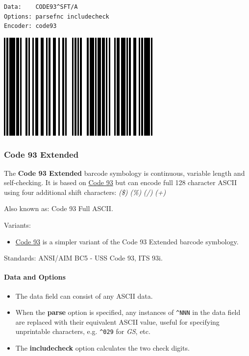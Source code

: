 \begin{verbatim}
Data:    CODE93^SFT/A
Options: parsefnc includecheck
Encoder: code93
\end{verbatim}

\includegraphics{images/code93-2.eps}

\hypertarget{code-93-extended}{%
\subsubsection{Code 93 Extended}\label{code-93-extended}}

The \textbf{Code 93 Extended} barcode symbology is continuous, variable
length and self-checking. It is based on
\protect\hyperlink{code-93}{Code 93} but can encode full 128 character
ASCII using four additional shift characters: \emph{(\$)} \emph{(\%)}
\emph{(/)} \emph{(+)}

Also known as: Code 93 Full ASCII.

Variants:

\begin{itemize}
\tightlist
\item
  \protect\hyperlink{code-93}{Code 93} is a simpler variant of the Code
  93 Extended barcode symbology.
\end{itemize}

Standards: ANSI/AIM BC5 - USS Code 93, ITS 93i.

\hypertarget{data-and-options-23}{%
\paragraph{Data and Options}\label{data-and-options-23}}

\begin{itemize}
\tightlist
\item
  The data field can consist of any ASCII data.
\item
  When the \textbf{parse} option is specified, any instances of
  \texttt{\^{}NNN} in the data field are replaced with their equivalent
  ASCII value, useful for specifying unprintable characters, e.g.
  \texttt{\^{}029} for \emph{GS}, etc.
\item
  The \textbf{includecheck} option calculates the two check digits.
\end{itemize}

